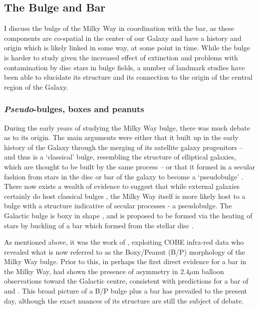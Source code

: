 \subsection{The Bulge and Bar}

I discuss the bulge of the Milky Way in coordination with the bar, as these components are co-spatial in the center of our Galaxy and have a history and origin which is likely linked in some way, at some point in time. While the bulge is harder to study given the increased effect of extinction and problems with contamination by disc stars in bulge fields, a number of landmark studies have been able to elucidate its structure and its connection to the origin of the central region of the Galaxy.

\subsubsection{\emph{Pseudo}-bulges, boxes and peanuts}
During the early years of studying the Milky Way bulge, there was much debate as to its origin. The main arguments were either that it built up in the early history of the Galaxy through the merging of its satellite galaxy progenitors -- and thus is a `classical' bulge, resembling the structure of elliptical galaxies, which are thought to be built by the same process -- or that it formed in a secular fashion from stars in the disc or bar of the galaxy to become a `pseudobulge' \citep[a useful summary of these definitions is provided in Section 1.1 of][]{2004ARA&A..42..603K}. There now exists a wealth of evidence to suggest that while external galaxies certainly do host classical bulges \citep[e.g.][]{2009MNRAS.393.1531G}, the Milky Way itself is more likely host to a bulge with a structure indicative of secular processes - a pseudobulge. The Galactic bulge is boxy in shape \citep[e.g][]{1995ApJ...445..716D}, and is proposed to be formed via the heating of stars by buckling of a bar which formed from the stellar disc \citep[e.g.][]{1981A&A....96..164C,1991Natur.352..411R}.

As mentioned above, it was the work of \citet{1995ApJ...445..716D}, exploiting COBE infra-red data who revealed what is now referred to as the Boxy/Peanut (B/P) morphology of the Milky Way bulge. Prior to this, in perhaps the first direct evidence for a bar in the Milky Way, \citet{1991ApJ...379..631B} had shown the presence of asymmetry in $2.4 \mu$m balloon observations \citep{1982AIPC...83...48M} toward the Galactic centre, consistent with predictions for a bar of \citet{1979A&AS...37..403S} and \citet{1980ApJ...236..779L}. This broad picture of a B/P bulge plus a bar has prevailed to the present day, although the exact nuances of its structure are still the subject of debate.

